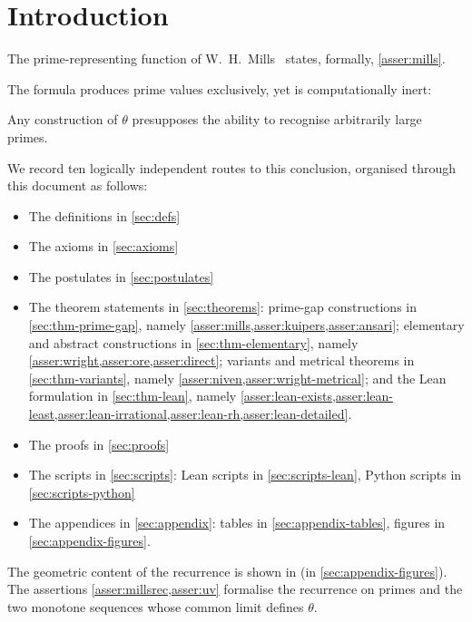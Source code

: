 \documentclass[11pt,reqno]{amsart}
\theoremstyle{blueplain}
\newcounter{asser}
\numberwithin{equation}{section}
\begin{document}
\newpage \thispagestyle{empty}

\bigskip

\tableofcontents

\bigskip

\newpage {} \pagestyle{plain}  %
\hypersetup{pageanchor=true}

\section{Introduction}

The prime-representing function of W.~H.~Mills~\cite{Mills1947} states,
formally, \cref{asser:mills}.

The formula produces prime values exclusively, yet is computationally inert:
\begin{center}
Any construction of $\theta $ presupposes the ability to recognise
arbitrarily large primes.
\end{center}

We record ten logically independent routes to this conclusion, organised
through this document as follows:

\begin{itemize}
\item The definitions in \cref{sec:defs}
\item The axioms in \cref{sec:axioms}
\item The postulates in \cref{sec:postulates}
\item The theorem statements in \cref{sec:theorems}: prime-gap constructions
in \cref{sec:thm-prime-gap}, namely
\cref{asser:mills,asser:kuipers,asser:ansari}; elementary and abstract
constructions in \cref{sec:thm-elementary}, namely
\cref{asser:wright,asser:ore,asser:direct}; variants and metrical theorems in
\cref{sec:thm-variants}, namely \cref{asser:niven,asser:wright-metrical}; and
the Lean formulation in \cref{sec:thm-lean}, namely
\cref{asser:lean-exists,asser:lean-least,asser:lean-irrational,asser:lean-rh,asser:lean-detailed}.
\item The proofs in \cref{sec:proofs}
\item The scripts in \cref{sec:scripts}: Lean scripts in
\cref{sec:scripts-lean}, Python scripts in \cref{sec:scripts-python}
\item The appendices in \cref{sec:appendix}: tables in
\cref{sec:appendix-tables}, figures in \cref{sec:appendix-figures}.
\end{itemize}

The geometric content of the recurrence is shown in
 (in \cref{sec:appendix-figures}). The assertions
\cref{asser:millsrec,asser:uv} formalise the recurrence on primes and the
two monotone sequences whose common limit defines $\theta $.
\end{document}
